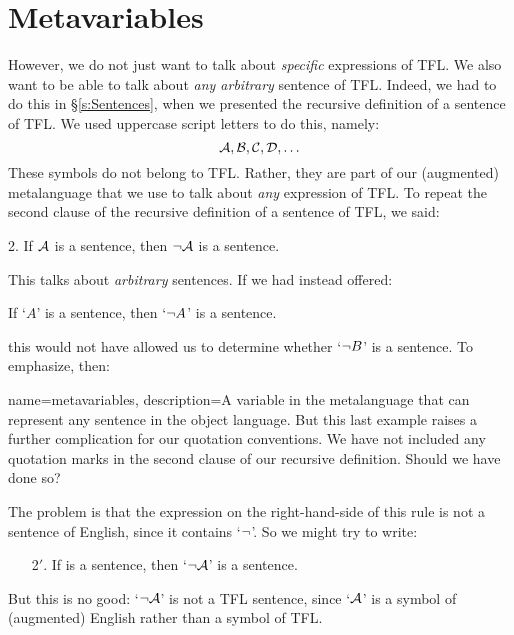 \section{Metavariables}\label{s:Metavariables}
However, we do not just want to talk about \emph{specific} expressions of TFL. We also want to be able to talk about \emph{any arbitrary} sentence of TFL. Indeed, we had to do this in \S\ref{s:Sentences}, when we presented the recursive definition of a sentence of TFL. We used uppercase script letters to do this, namely:
	$$\mathcal{A}, \mathcal{B}, \mathcal{C}, \mathcal{D}, \ldots$$
These symbols do not belong to TFL. Rather, they are part of our (augmented) metalanguage that we use to talk about \emph{any} expression of TFL. To repeat the second clause of the recursive definition of a sentence of TFL, we said:
	\begin{earg}
		\item[2.] If $\mathcal{A}$ is a sentence, then $\neg \mathcal{A}$ is a sentence.
	\end{earg}
This talks about \emph{arbitrary} sentences. If we had instead offered:
	\begin{ebullet}
		\item If `$A$' is a sentence, then `$\neg A$' is a sentence.
	\end{ebullet}
this would not have allowed us to determine whether `$\neg B$' is a sentence. To emphasize, then:

{
name=metavariables,
description={A variable in the metalanguage that can represent any sentence in the object language.}
}
But this last example raises a further complication for our quotation conventions. We have not included any quotation marks in the second clause of our recursive definition. Should we have done so?

The problem is that the expression on the right-hand-side of this rule is not a sentence of English, since it contains `$\neg$'. So we might try to write:
	\begin{enumerate}
		\item[2$'$.] If  is a sentence, then `$\neg \mathcal{A}$' is a sentence.
	\end{enumerate}
But this is no good: `$\neg \mathcal{A}$' is not a TFL sentence, since `$\mathcal{A}$' is a symbol of (augmented) English rather than a symbol of TFL.

